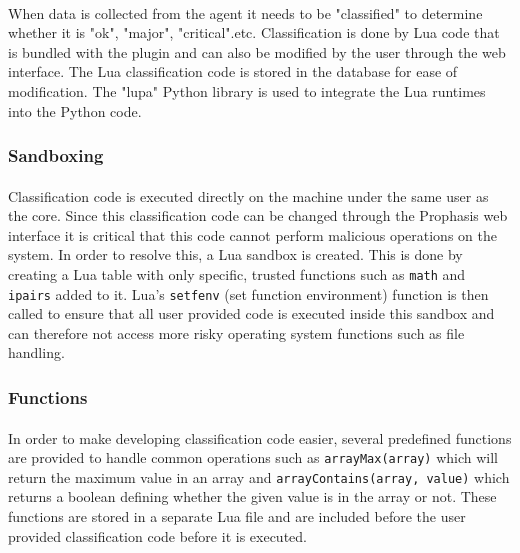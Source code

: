 \documentclass[bsc,logo,twoside]{infthesis}
\begin{document}
\paragraph*{}
	When data is collected from the agent it needs to be "classified" to determine
	whether it is "ok", "major", "critical".etc.  Classification is done by Lua
	code that is bundled with the plugin and can also be modified by the user
	through the web interface.  The Lua classification code is stored in the
	database for ease of modification.  The "lupa" Python library is used to
	integrate the Lua runtimes into the Python code.
	
\subsubsection{Sandboxing}
\label{classification_sandboxing}
\paragraph*{}
	Classification code is executed directly on the machine
	under the same user as the core.  Since this classification code can be
	changed through the Prophasis web interface it is critical that this code
	cannot perform malicious operations on the system.  In order to resolve this,
	a Lua sandbox is created.  This is done by creating a Lua table with only
	specific, trusted functions such as \texttt{math} and \texttt{ipairs} added
	to it.  Lua's \texttt{setfenv} (set function environment) function is then
	called to ensure that all user provided code is executed inside this sandbox
	and can therefore not access more risky operating system functions such as file
	handling.
	
\subsubsection{Functions}
\paragraph*{}
	In order to make developing classification code easier, several predefined
	functions are provided to handle common operations such as
	\texttt{arrayMax(array)} which will return the maximum value in an array and
	\texttt{arrayContains(array, value)} which returns a boolean
	defining whether the given value is in the array or not.  These functions are
	stored in a	separate Lua file and are included before the user provided
	classification code before it is executed.
	
\end{document}
